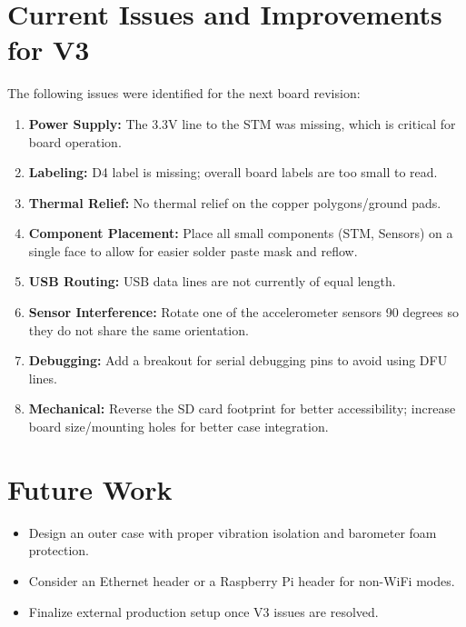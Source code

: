 \documentclass[12pt,a4paper]{article}
\begin{document}
\section{Current Issues and Improvements for V3}
The following issues were identified for the next board revision:
\begin{enumerate}
    \item \textbf{Power Supply:} The 3.3V line to the STM was missing, which is critical for board operation.
    \item \textbf{Labeling:} D4 label is missing; overall board labels are too small to read.
    \item \textbf{Thermal Relief:} No thermal relief on the copper polygons/ground pads.
    \item \textbf{Component Placement:} Place all small components (STM, Sensors) on a single face to allow for easier solder paste mask and reflow.
    \item \textbf{USB Routing:} USB data lines are not currently of equal length.
    \item \textbf{Sensor Interference:} Rotate one of the accelerometer sensors 90 degrees so they do not share the same orientation.
    \item \textbf{Debugging:} Add a breakout for serial debugging pins to avoid using DFU lines.
    \item \textbf{Mechanical:} Reverse the SD card footprint for better accessibility; increase board size/mounting holes for better case integration.
\end{enumerate}

\section{Future Work}
\begin{itemize}
    \item Design an outer case with proper vibration isolation and barometer foam protection.
    \item Consider an Ethernet header or a Raspberry Pi header for non-WiFi modes.
    \item Finalize external production setup once V3 issues are resolved.
\end{itemize}
\end{document}
